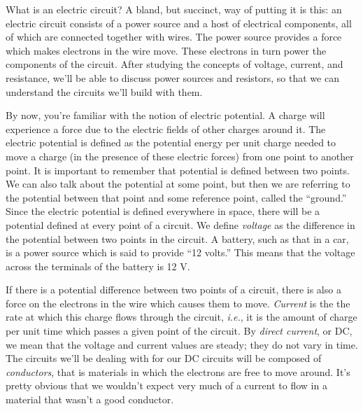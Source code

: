 What is an electric circuit?  A bland, but succinct, way of putting it is 
this: an electric circuit consists of a power source and a host of electrical 
components, all of which are connected together with wires.  The power source 
provides a force which makes electrons in the wire move.  These electrons in 
turn power the components of the circuit. After studying the concepts of 
voltage, current, and resistance, we'll be able to discuss power sources and 
resistors, so that we can understand the circuits we'll build with them. 

By now, you're familiar with the notion of electric potential.  A charge will
experience a force due to the electric fields of other charges around it.
The electric potential is defined as the potential energy per unit charge 
needed to move a charge (in the presence of these electric forces) from one 
point to another point.  It is important to remember that potential is defined
between two points. We can also talk about the potential at some point, but 
then we are referring to the potential between that point and some reference 
point, called the ``ground.''  Since the electric potential is defined 
everywhere in space, there will be a potential defined at every point of a 
circuit. We define {\it voltage} as the difference in the potential between 
two points in the circuit.  A battery, such as that in a car, is a power 
source which is said to provide ``12 volts.'' This means that the voltage
across the terminals of the battery is 12 V. 

If there is a potential difference between two points of a circuit, there is 
also a force on the electrons in the wire which causes them to move.  
{\it Current} is the the rate at which this charge flows through the circuit,
{\it i.e.}, it is the amount of charge per unit time which passes a given 
point of the circuit. By {\it direct current}, or DC, we mean that the voltage 
and current values are steady; they do not vary in time. The circuits we'll be 
dealing with for our DC circuits will be composed of {\it conductors}, that is 
materials in which the electrons are free to move around.  It's pretty obvious 
that we wouldn't expect very much of a current to flow in a material that 
wasn't a good conductor. 

